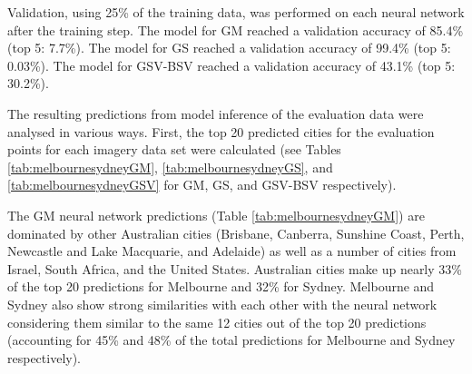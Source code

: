 \documentclass[10pt,letterpaper]{article}
\begin{document}
Validation, using 25\% of the training data, was performed on each neural network after the training step. The model for GM reached a validation accuracy of 85.4\% (top 5: 7.7\%). The model for GS reached a validation accuracy of 99.4\% (top 5: 0.03\%). The model for GSV-BSV reached a validation accuracy of 43.1\% (top 5: 30.2\%).

The resulting predictions from model inference of the evaluation data were analysed in various ways. First, the top 20 predicted cities for the evaluation points for each imagery data set were calculated (see Tables \ref{tab:melbournesydneyGM}, \ref{tab:melbournesydneyGS}, and \ref{tab:melbournesydneyGSV} for GM, GS, and GSV-BSV respectively).



The GM neural network predictions (Table \ref{tab:melbournesydneyGM}) are dominated by other Australian cities (Brisbane, Canberra, Sunshine Coast, Perth, Newcastle and Lake Macquarie, and Adelaide) as well as a number of cities from Israel, South Africa, and the United States. Australian cities make up nearly 33\% of the top 20 predictions for Melbourne and 32\% for Sydney. Melbourne and Sydney also show strong similarities with each other with the neural network considering them similar to the same 12 cities out of the top 20 predictions (accounting for 45\% and 48\% of the total predictions for Melbourne and Sydney respectively).
\end{document}
